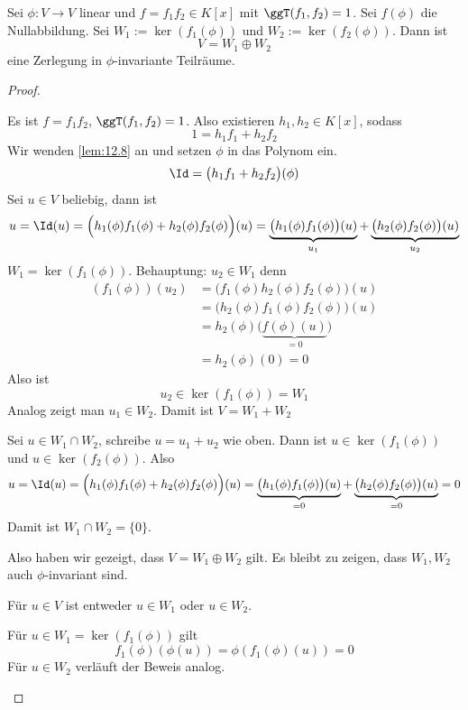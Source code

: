 \documentclass{mycourse}
\begin{document}
\begin{lem}
\label{lem:12.9}
Sei $\phi: V\to V$ linear und $f=f_1f_2\in K[x]$ mit $\ggT(f_1,f_2)=1$.
Sei $f(\phi)$ die Nullabbildung.
Sei $W_1:=\ker(f_1(\phi))$ und $W_2:=\ker(f_2(\phi))$.
Dann ist
\[
V=W_1\oplus W_2
\]
eine Zerlegung in $\phi$-invariante Teilräume.

\begin{proof}
	\begin{seg}[$V=W_1+W_2$]
Es ist $f=f_1f_2$, $\ggT(f_1,f_2)= 1$.
Also existieren $h_1,h_2\in K[x]$, sodass
\[
1=h_1f_1+h_2f_2
\]
Wir wenden \ref{lem:12.8} an und setzen $\phi$ in das Polynom ein.
\[
	\Id=\big(h_1f_1+h_2f_2\big)(\phi)
\]
Sei $u\in V$ beliebig, dann ist
\[
	u= \Id(u) = \Big(h_1(\phi)f_1(\phi) + h_2(\phi)f_2(\phi)\Big)(u) = \underbrace{\big(h_1(\phi)f_1(\phi)\big)(u)}_{u_1} + \underbrace{\big(h_2(\phi)f_2(\phi)\big)(u)}_{u_2} 
\]
$W_1=\ker(f_1(\phi))$. Behauptung: $u_2\in W_1$ denn
\begin{align*}
(f_1(\phi))(u_2) &= \big(f_1(\phi)h_2(\phi)f_2(\phi)\big)(u) \\
&= \big(h_2(\phi)f_1(\phi)f_2(\phi)\big)(u)\\
&= h_2(\phi)\big(\underbrace{f(\phi)(u)}_{=0}\big)\\
&= h_2(\phi)(0) = 0
\end{align*}
Also ist
\[
u_2\in \ker(f_1(\phi)) = W_1
\]
Analog zeigt man $u_1\in W_2$.
Damit ist $V=W_1+W_2$
\end{seg}
\begin{seg}[$W_1\cap W_2 =\{0\}$]
Sei $u\in W_1\cap W_2$, schreibe $u=u_1+u_2$ wie oben.
Dann ist $u\in \ker(f_1(\phi))$ und $u\in \ker(f_2(\phi))$.
Also
\[
	u= \Id(u) = \Big(h_1(\phi)f_1(\phi) + h_2(\phi)f_2(\phi)\Big)(u) = \underbrace{\big(h_1(\phi)f_1(\phi)\big)(u)}_{=0} + \underbrace{\big(h_2(\phi)f_2(\phi)\big)(u)}_{=0}  =0
\]
Damit ist $W_1\cap W_2 = \{0\}$.
\end{seg}
Also haben wir gezeigt, dass $V=W_1\oplus W_2$ gilt.
Es bleibt zu zeigen, dass $W_1,W_2$ auch $\phi$-invariant sind.

\begin{seg}
	Für $u\in V$ ist entweder $u\in W_1$ oder $u\in W_2$.

Für $u\in W_1=\ker(f_1(\phi))$ gilt
\[
f_1(\phi)(\phi(u)) = \phi(f_1(\phi)(u)) = 0
\]
Für $u\in W_2$ verläuft der Beweis analog.
\end{seg}
\end{proof}

\end{lem}
\end{document}
